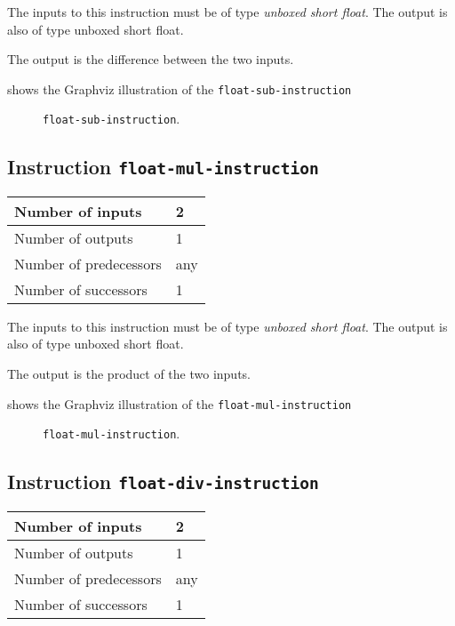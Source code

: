 The inputs to this instruction must be of type \emph{unboxed short
  float}. The output is also of type unboxed short float.

The output is the difference between the two inputs.

 shows the Graphviz illustration of the
\texttt{float-sub-instruction}

\begin{figure}
\begin{center}
\end{center}
\caption{\label{fig-float-sub-instruction}
\texttt{float-sub-instruction}.}
\end{figure}

\subsection{Instruction \texttt{float-mul-instruction}}
\label{mir-instruction-float-mul}

\begin{tabular}{|l|l|}
\hline
Number of inputs & 2\\
\hline
Number of outputs & 1\\
\hline
Number of predecessors & any\\
\hline
Number of successors & 1\\
\hline
\end{tabular}

The inputs to this instruction must be of type \emph{unboxed short
  float}. The output is also of type unboxed short float.

The output is the product of the two inputs.

 shows the Graphviz illustration of the
\texttt{float-mul-instruction}

\begin{figure}
\begin{center}
\end{center}
\caption{\label{fig-float-mul-instruction}
\texttt{float-mul-instruction}.}
\end{figure}

\subsection{Instruction \texttt{float-div-instruction}}
\label{mir-instruction-float-div}

\begin{tabular}{|l|l|}
\hline
Number of inputs & 2\\
\hline
Number of outputs & 1\\
\hline
Number of predecessors & any\\
\hline
Number of successors & 1\\
\hline
\end{tabular}

